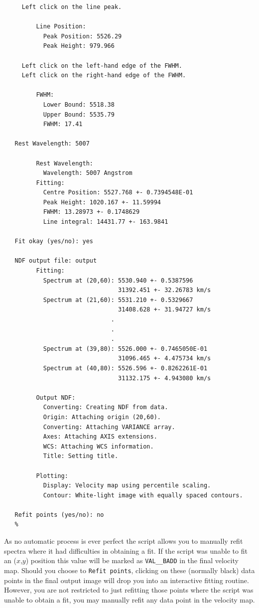 \documentclass[twoside,11pt]{article}
\begin{document}
{\begin{verbatim}
     Left click on the line peak.
  
         Line Position:
           Peak Position: 5526.29
           Peak Height: 979.966
 
     Left click on the left-hand edge of the FWHM.
     Left click on the right-hand edge of the FWHM.
 
         FWHM:
           Lower Bound: 5518.38
           Upper Bound: 5535.79
           FWHM: 17.41
 
   Rest Wavelength: 5007
 
         Rest Wavelength:
           Wavelength: 5007 Angstrom
         Fitting:
           Centre Position: 5527.768 +- 0.7394548E-01
           Peak Height: 1020.167 +- 11.59994
           FWHM: 13.28973 +- 0.1748629
           Line integral: 14431.77 +- 163.9841
 
   Fit okay (yes/no): yes
 
   NDF output file: output
         Fitting:
           Spectrum at (20,60): 5530.940 +- 0.5387596
                                31392.451 +- 32.26783 km/s
           Spectrum at (21,60): 5531.210 +- 0.5329667
                                31408.628 +- 31.94727 km/s
                              .
                              .
                              .
           Spectrum at (39,80): 5526.000 +- 0.7465050E-01
                                31096.465 +- 4.475734 km/s
           Spectrum at (40,80): 5526.596 +- 0.8262261E-01
                                31132.175 +- 4.943080 km/s
 
         Output NDF:
           Converting: Creating NDF from data.
           Origin: Attaching origin (20,60).
           Converting: Attaching VARIANCE array.
           Axes: Attaching AXIS extensions.
           WCS: Attaching WCS information.
           Title: Setting title.

         Plotting:
           Display: Velocity map using percentile scaling.
           Contour: White-light image with equally spaced contours.
 
   Refit points (yes/no): no
   %
\end{verbatim}\normalsize

As no automatic process is ever perfect the script allows you to
manually refit spectra where it had difficulties in obtaining a fit.
If the script was unable to fit an ($x$,$y$) position this value will be
marked as {\tt VAL\_\_BADD} in the final velocity map.  Should you choose
to {\tt Refit points}, clicking on these (normally black) data points in
the final output image will drop you into an interactive fitting
routine.  However, you are not restricted to just refitting those points
where the script was unable to obtain a fit, you may manually refit
any data point in the velocity map.

}
\end{document}
